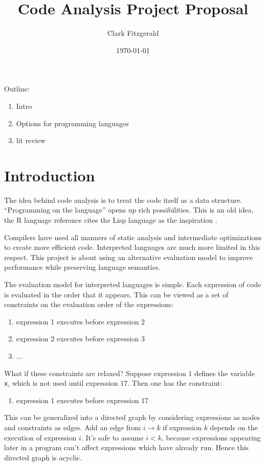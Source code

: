 \documentclass[12pt]{article}
\begin{document}
\title{Code Analysis Project Proposal}
\date{\today}
\author{Clark Fitzgerald}
\maketitle

\begin{abstract}

\end{abstract}

Outline:
\begin{enumerate}
    \item Intro
    \item Options for programming languages
    \item lit review
\end{enumerate}

\section{Introduction}

The idea behind code analysis is to treat the code itself as a data
structure. ``Programming on the language'' opens up rich possibilities.
This is an old idea, the R language reference cites the Lisp
language as the inspiration \cite{Rlang}.

Compilers have used all manners of static analysis and
intermediate optimizations to create more efficient code. Interpreted
languages are much more limited in this respect. This project is about
using an alternative evaluation model to improve performance while
preserving language semantics.

The evaluation model for interpreted languages is simple. Each
expression of code is evaluated in the order that it appears. This can be
viewed as a set of constraints on the evaluation order of the expressions:
\begin{enumerate}
    \item expression 1 executes before expression 2
    \item expression 2 executes before expression 3
    \item $\dots$
\end{enumerate}
What if these constraints are relaxed? Suppose expression 1 defines the variable
\texttt{x}, which is not used until expression 17. Then one has the
constraint:
\begin{enumerate}
    \item expression 1 executes before expression 17
\end{enumerate}
This can be generalized into a directed graph by considering expressions as
nodes and constraints as edges. Add an edge from $i \rightarrow k$ if
expression $k$ depends on the execution of expression $i$.  It's safe to
assume $i < k$, because expressions appearing later in a program can't
affect expressions which have already run. Hence this directed graph is
acyclic.
\end{document}

